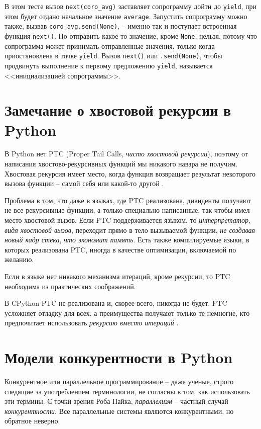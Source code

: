 \documentclass[%
	11pt,
	a4paper,
	utf8,
		]{article}
\begin{document}
В этом тесте вызов \verb*|next(coro_avg)| заставляет сопрограмму дойти до \verb|yield|, при этом будет отдано начальное значение \verb*|average|. Запустить сопрограмму можно также, вызвав \verb|coro_avg.send(None)|, -- именно так и поступает встроенная функция \verb*|next()|. Но отправить какое-то значение, кроме \verb|None|, нельзя, потому что сопрограмма может принимать отправленные значения, только когда приостановлена в точке \verb*|yield|. Вызов \verb|next()| или \verb*|.send(None)|, чтобы продвинуть выполнение к первому предложению \verb|yield|, называется <<инициализацией сопрограммы>>.

\section{Замечание о хвостовой рекурсии в Python}

{\color{red}В Python нет PTC (Proper Tail Calls, \emph{чисто хвостовой рекурсии})}, поэтому от написания хвостово-рекурсивных функций мы никакого навара не получим. Хвостовая рекурсия имеет место, когда функция возвращает результат некоторого вызова функции -- самой себя или какой-то другой \cite[]{ramalho:python-2022}.

Проблема в том, что даже в языках, где PTC реализована, дивиденты получают не все рекурсивные функции, а только специально написанные, так чтобы имел место хвостовой вызов. Если PTC поддерживается языком, то \emph{интерпретатор}, \emph{видя хвостовой вызов}, переходит прямо в тело вызываемой функции, \emph{не создавая новый кадр стека}, \emph{что экономит память}. Есть также компилируемые языки, в которых реализована PTC, иногда в качестве оптимизации, включаемой по желанию.

Если в языке нет никакого механизма итераций, кроме рекурсии, то PTC необходима из практических соображений.

В CPython PTC не реализована и, скорее всего, никогда не будет. PTC усложняет отладку для всех, а преимущества получают только те немногие, кто предпочитает использовать \emph{рекурсию вместо итераций} \cite[]{ramalho:python-2022}.

\section{Модели конкурентности в Python}

Конкурентное или параллельное программирование -- даже ученые, строго следящие за употреблением терминологии, не согласны в том, как использовать эти термины. С точки зрения Роба Пайка, \emph{параллелизм} -- частный случай \emph{конкурентности}. Все параллельные системы являются конкурентными, но обратное неверно.
\end{document}
